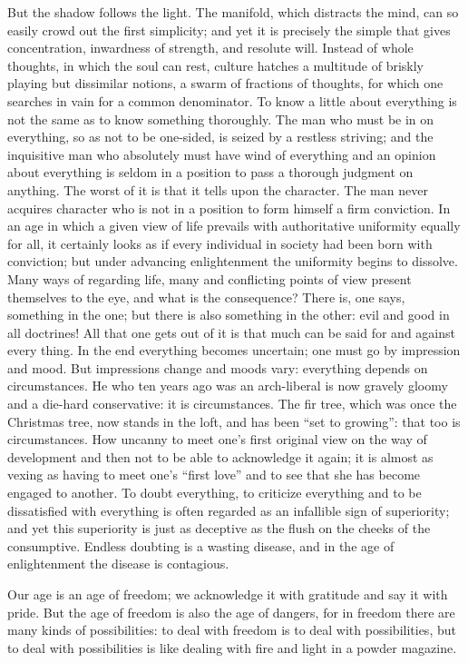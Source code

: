 \documentclass[12pt,a4paper,openany]{book}
\newcommand{\opage}[1]{\marginnote{\footnotesize\textit{[#1]}}}
\begin{document}
But the shadow follows the light. The manifold,
which distracts the mind, can so easily crowd out the first
simplicity; and yet it is precisely the simple that
gives concentration, inwardness of strength, and resolute will.
Instead of whole thoughts, in which the soul can rest, culture
hatches a multitude of briskly playing but
dissimilar notions, a swarm of fractions of thoughts,
for which one searches in vain for a common denominator. To
know a little about everything is not the same as to know
something thoroughly. The man who must be in on everything, so as
not to be one-sided, is seized by a restless striving; and the
inquisitive man who absolutely must have wind of everything and an
opinion about everything is seldom in a position to pass a
thorough judgment on anything. The worst of it is that it tells
upon the character. The man never acquires
character who is not in a position to form himself a
firm conviction. In an age in which a given
view of life prevails with authoritative uniformity equally
for all, it certainly looks as if every
individual in society had been born with conviction; but
under advancing enlightenment the uniformity begins
to dissolve. Many ways of regarding life,
many and conflicting points of view present themselves to the eye,
and what is the consequence? There is, one says, something in
the one; but there is also something in the other: evil
and good in all doctrines! All that one gets out of it
is that much can be said for and against every thing.
In the end everything becomes uncertain; one must go by impression
and mood. But impressions change and 
\setcounter{footnote}{0}%
\opage{56}moods vary: everything depends on circumstances.
He who ten years ago was an arch-liberal is now gravely
gloomy and a die-hard conservative: it is circumstances.
The fir tree, which was once the Christmas tree, now stands in the loft,
and has been ``set to growing'': that too is circumstances.
How uncanny to meet one's first original view
on the way of development and then not to be able to
acknowledge it again; it is almost as
vexing as having to meet one's ``first love''
and to see that she has become engaged to another. To
doubt everything, to criticize everything and to be dissatisfied with
everything is often regarded as an infallible sign of
superiority; and yet this superiority is just as
deceptive as the flush on the cheeks of the consumptive.
Endless doubting is a wasting disease, and in the age of enlightenment
the disease is contagious.

Our age is an age of freedom; we acknowledge it
with gratitude and say it with pride. But
the age of freedom is also the age of dangers, for in freedom
there are many kinds of possibilities: to deal with freedom
is to deal with possibilities, but to deal
with possibilities is like dealing with fire and light in
a powder magazine.
\end{document}
